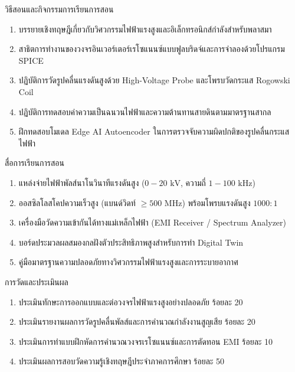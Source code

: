 \newpage

\begin{planbox}{วิธีสอนและกิจกรรมการเรียนการสอน}
\begin{enumerate}
    \item บรรยายเชิงทฤษฎีเกี่ยวกับวิศวกรรมไฟฟ้าแรงสูงและอิเล็กทรอนิกส์กำลังสำหรับพลาสมา
    \item สาธิตการทำงานของวงจรอินเวอร์เตอร์เรโซแนนซ์แบบฟูลบริดจ์และการจำลองด้วยโปรแกรม SPICE
    \item ปฏิบัติการวัดรูปคลื่นแรงดันสูงด้วย High-Voltage Probe และโพรบวัดกระแส Rogowski Coil
    \item ปฏิบัติการทดสอบค่าความเป็นฉนวนไฟฟ้าและความต้านทานสายดินตามมาตรฐานสากล
    \item ฝึกทดสอบโมเดล Edge AI Autoencoder ในการตรวจจับความผิดปกติของรูปคลื่นกระแสไฟฟ้า
\end{enumerate}
\end{planbox}

\begin{planbox}{สื่อการเรียนการสอน}
\begin{enumerate}
    \item แหล่งจ่ายไฟฟ้าพัลส์นาโนวินาทีแรงดันสูง ($0 - 20 \text{ kV}$, ความถี่ $1 - 100 \text{ kHz}$)
    \item ออสซิลโลสโคปความเร็วสูง (แบนด์วิดท์ $\ge 500 \text{ MHz}$) พร้อมโพรบแรงดันสูง $1000:1$
    \item เครื่องมือวัดความเข้ากันได้ทางแม่เหล็กไฟฟ้า (EMI Receiver / Spectrum Analyzer)
    \item บอร์ดประมวลผลสมองกลฝังตัวประสิทธิภาพสูงสำหรับการทำ Digital Twin
    \item คู่มือมาตรฐานความปลอดภัยทางวิศวกรรมไฟฟ้าแรงสูงและการระบายอากาศ
\end{enumerate}
\end{planbox}

\begin{planbox}{การวัดและประเมินผล}
\begin{enumerate}
    \item ประเมินทักษะการออกแบบและต่อวงจรไฟฟ้าแรงสูงอย่างปลอดภัย ร้อยละ 20
    \item ประเมินรายงานผลการวัดรูปคลื่นพัลส์และการคำนวณกำลังงานสูญเสีย ร้อยละ 20
    \item ประเมินการทำแบบฝึกหัดการคำนวณวงจรเรโซแนนซ์และการตัดทอน EMI ร้อยละ 10
    \item ประเมินผลการสอบวัดความรู้เชิงทฤษฎีประจำภาคการศึกษา ร้อยละ 50
\end{enumerate}
\end{planbox}

